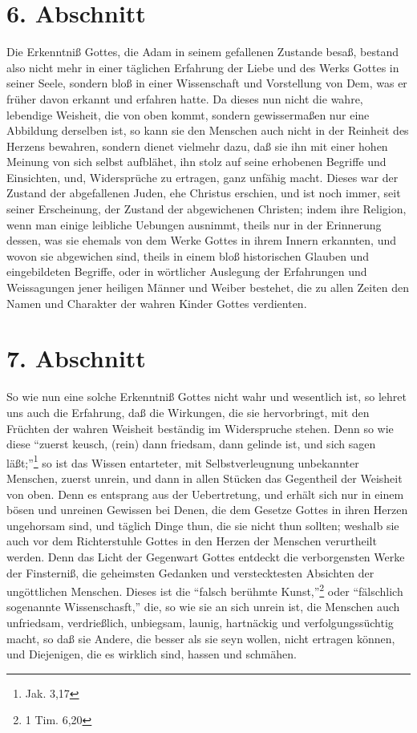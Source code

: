 \section{6. Abschnitt}

Die Erkenntniß Gottes, die Adam in seinem gefallenen Zustande besaß, bestand also nicht mehr in einer täglichen Erfahrung der Liebe und des Werks Gottes in seiner Seele, sondern bloß in einer Wissenschaft und Vorstellung von Dem, was er früher davon erkannt und erfahren hatte. Da dieses nun nicht die wahre, lebendige Weisheit, die von oben kommt, sondern gewissermaßen nur eine Abbildung derselben ist, so kann sie den Menschen auch nicht in der Reinheit des Herzens bewahren, sondern dienet vielmehr dazu, daß sie ihn mit einer hohen Meinung von sich selbst aufblähet, ihn stolz auf seine erhobenen Begriffe und Einsichten, und, Widersprüche zu ertragen, ganz unfähig macht. Dieses war der Zustand der abgefallenen Juden, ehe Christus erschien, und ist noch immer, seit seiner Erscheinung, der Zustand der abgewichenen Christen; indem ihre Religion, wenn man einige leibliche Uebungen ausnimmt, theils nur in der Erinnerung dessen, was sie ehemals von dem Werke Gottes in ihrem Innern erkannten, und wovon sie abgewichen sind, theils in einem bloß historischen Glauben und eingebildeten Begriffe, oder in wörtlicher Auslegung der Erfahrungen und Weissagungen jener heiligen Männer und Weiber bestehet, die zu allen Zeiten den Namen und Charakter der wahren Kinder Gottes verdienten.

\section{7. Abschnitt}

So wie nun eine solche Erkenntniß Gottes nicht wahr und wesentlich ist, so lehret uns auch die Erfahrung, daß die Wirkungen, die sie hervorbringt, mit den Früchten der wahren Weisheit beständig im Widerspruche stehen. Denn so wie diese "`zuerst keusch, (rein) dann friedsam, dann gelinde ist, und sich sagen läßt;"'\footnote{Jak. 3,17} so ist das Wissen entarteter, mit Selbstverleugnung unbekannter Menschen, zuerst unrein, und dann in allen Stücken das Gegentheil der Weisheit von oben. Denn es entsprang aus der Uebertretung, und erhält sich nur in einem bösen und unreinen Gewissen bei Denen, die dem Gesetze Gottes in ihren Herzen ungehorsam sind, und täglich Dinge thun, die sie nicht thun sollten; weshalb sie auch vor dem Richterstuhle Gottes in den Herzen der Menschen verurtheilt werden. Denn das Licht der Gegenwart Gottes entdeckt die verborgensten Werke der Finsterniß, die geheimsten Gedanken und verstecktesten Absichten der ungöttlichen Menschen. Dieses ist die "`falsch berühmte Kunst,"'\footnote{1 Tim. 6,20} oder  "`fälschlich sogenannte Wissenschasft,"' die, so wie sie an sich unrein ist, die Menschen auch unfriedsam, verdrießlich, unbiegsam, launig, hartnäckig und verfolgungssüchtig macht, so daß sie Andere, die besser als sie seyn wollen, nicht ertragen können, und Diejenigen, die es wirklich sind, hassen und schmähen.

